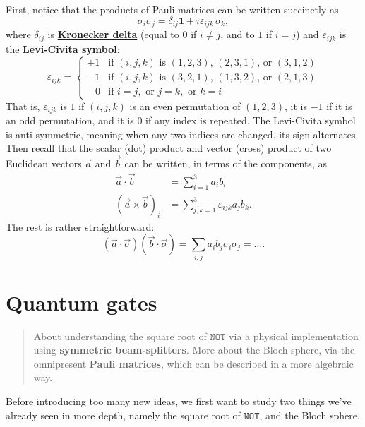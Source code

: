 \documentclass[fleqn,a4paper]{article}
\let\oldsection\section
\renewcommand\section{\clearpage\oldsection}
\theoremstyle{definition}
\theoremstyle{definition}
\theoremstyle{definition}
\theoremstyle{definition}
\theoremstyle{remark}
\begin{document}
First, notice that the products of Pauli matrices can be written succinctly as
\[
 \sigma_{i}\sigma_{j}
 = \delta _{ij}\mathbf{1}+ i\varepsilon_{ijk}\,\sigma _{k},
\]
where \(\delta_{ij}\) is \href{https://en.wikipedia.org/wiki/Kronecker_delta}{\textbf{Kronecker delta}} (equal to \(0\) if \(i\neq j\), and to \(1\) if \(i=j\)) and \(\varepsilon_{ijk}\) is the \href{https://en.wikipedia.org/wiki/Levi-Civita_symbol\#Three_dimensions}{\textbf{Levi-Civita symbol}}:
\[
 \varepsilon_{ijk}
 = \begin{cases}
  +1 & {\text{if }}(i,j,k){\text{ is }}(1,2,3)\text{, }(2,3,1){\text{, or }}(3,1,2)
\\-1 & {\text{if }}(i,j,k){\text{ is }}(3,2,1)\text{, }(1,3,2){\text{, or }}(2,1,3)
\\\;\;\;0 & {\text{if }}i=j,{\text{ or }}j=k,{\text{ or }}k=i
\end{cases}
\]
That is, \(\varepsilon _{ijk}\) is \(1\) if \((i, j, k)\) is an even permutation of \((1, 2, 3)\), it is \(-1\) if it is an odd permutation, and it is \(0\) if any index is repeated.
The Levi-Civita symbol is anti-symmetric, meaning when any two indices are changed, its sign alternates.
Then recall that the scalar (dot) product and vector (cross) product of two Euclidean vectors \(\vec{a}\) and \(\vec{b}\) can be written, in terms of the components, as
\[
  \begin{aligned}
    \vec{a}\cdot\vec{b}
    &= \sum_{i=1}^3 a_i b_i
  \\(\vec{a}\times\vec{b})_i
    &= \sum_{j,k=1}^3 \varepsilon_{ijk}a_jb_k.
  \end{aligned}
\]
The rest is rather straightforward:
\[
  (\vec{a}\cdot\vec{\sigma})(\vec{b}\cdot\vec{\sigma})
  = \sum_{i,j}a_i b_j\sigma_i\sigma_j
  = \ldots.
\]

\hypertarget{quantum-gates}{%
\section{Quantum gates}\label{quantum-gates}}

\begin{quote}
About understanding the square root of \(\texttt{NOT}\) via a physical implementation using \textbf{symmetric beam-splitters}.
More about the Bloch sphere, via the omnipresent \textbf{Pauli matrices}, which can be described in a more algebraic way.
\end{quote}

Before introducing too many new ideas, we first want to study two things we've already seen in more depth, namely the square root of \(\texttt{NOT}\), and the Bloch sphere.
\end{document}
